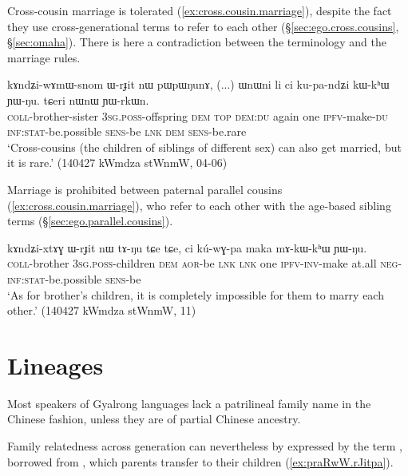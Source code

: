 Cross-cousin marriage is tolerated (\ref{ex:cross.cousin.marriage}), despite the fact they use cross-generational terms to refer to each other (§\ref{sec:ego.cross.cousins}, §\ref{sec:omaha}). There is here a contradiction between the terminology and the marriage rules.

\begin{exe}
\ex \label{ex:cross.cousin.marriage}
\gll kɤndʑi-wɤmɯ-snom ɯ-rɟit nɯ pɯpɯŋunɤ, (...) ɯnɯni li ci ku-pa-ndʑi kɯ-kʰɯ ɲɯ-ŋu. tɕeri nɯnɯ ɲɯ-rkɯn. \\
\textsc{coll}-brother-sister \textsc{3sg}.\textsc{poss}-offspring \textsc{dem} \textsc{top} { } \textsc{dem}:\textsc{du} again one \textsc{ipfv}-make-\textsc{du} \textsc{inf}:\textsc{stat}-be.possible \textsc{sens}-be \textsc{lnk} \textsc{dem} \textsc{sens}-be.rare \\ 
\glt `Cross-cousins (the children of siblings of different sex) can also get married, but it is rare.' (140427 kWmdza stWnmW, 04-06)
\end{exe}

Marriage is prohibited between paternal parallel cousins (\ref{ex:cross.cousin.marriage}), who refer to each other with the age-based sibling terms (§\ref{sec:ego.parallel.cousins}).

\begin{exe}
\ex \label{ex:FBCh.marriage}
\gll kɤndʑi-xtɤɣ ɯ-rɟit nɯ tɤ-ŋu tɕe tɕe, ci kú-wɣ-pa maka mɤ-kɯ-kʰɯ ɲɯ-ŋu. \\
\textsc{coll}-brother \textsc{3sg}.\textsc{poss}-children \textsc{dem} \textsc{aor}-be \textsc{lnk} \textsc{lnk} one \textsc{ipfv}-\textsc{inv}-make at.all \textsc{neg}-\textsc{inf}:\textsc{stat}-be.possible \textsc{sens}-be \\
\glt `As for brother's children, it is completely impossible for them to marry each other.' (140427 kWmdza stWnmW, 11)
\end{exe}

\section{Lineages} \label{sec:lineage.kinship}
Most speakers of Gyalrong languages lack a patrilineal family name in the Chinese fashion, unless they are of partial Chinese ancestry. 

Family relatedness across generation can nevertheless by expressed by the term , borrowed from , which parents transfer to their children (\ref{ex:praRwW.rJitpa}).

